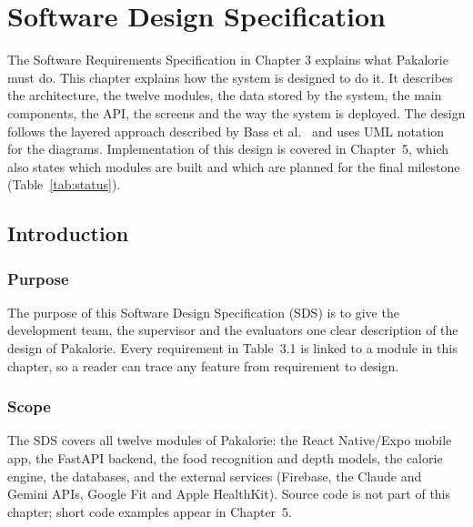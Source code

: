 
\chapter{Software Design Specification}

The Software Requirements Specification in Chapter 3 explains what Pakalorie must do.
This chapter explains how the system is designed to do it. It describes the architecture,
the twelve modules, the data stored by the system, the main components, the API, the
screens and the way the system is deployed. The design follows the layered approach
described by Bass et al.~\cite{sds_1} and uses UML notation~\cite{sq_diagrams} for the
diagrams. Implementation of this design is covered in Chapter~5, which also states which
modules are built and which are planned for the final milestone (Table~\ref{tab:status}).

\section{Introduction}
\subsection{Purpose}
The purpose of this Software Design Specification (SDS) is to give the development team,
the supervisor and the evaluators one clear description of the design of Pakalorie. Every
requirement in Table~3.1 is linked to a module in this chapter, so a reader can trace any
feature from requirement to design.

\subsection{Scope}
The SDS covers all twelve modules of Pakalorie: the React Native/Expo mobile app, the
FastAPI backend, the food recognition and depth models, the calorie engine, the databases,
and the external services (Firebase, the Claude and Gemini APIs, Google Fit and Apple
HealthKit). Source code is not part of this chapter; short code examples appear in
Chapter~5.

